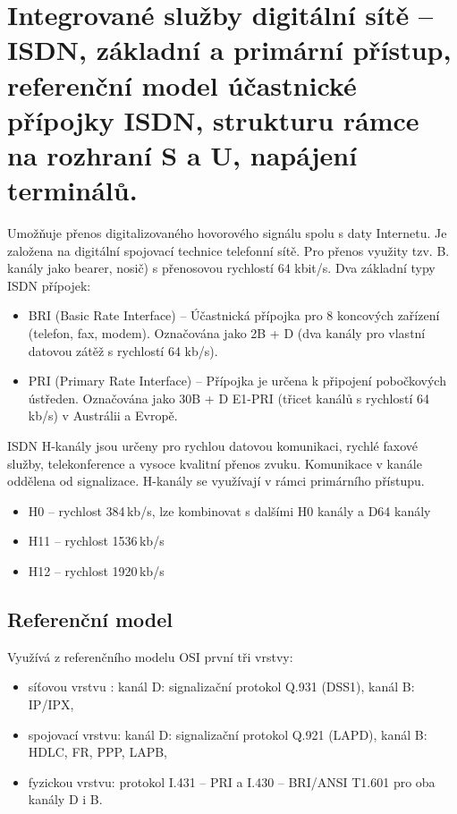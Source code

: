 \clearpage
\section{Integrované služby digitální sítě -- ISDN, základní a primární přístup, referenční model účastnické přípojky ISDN, strukturu rámce na rozhraní S a U, napájení terminálů.}
Umožňuje přenos digitalizovaného hovorového signálu spolu s daty Internetu. Je založena na digitální spojovací technice telefonní sítě.
Pro přenos využity tzv. B. kanály jako bearer, nosič) s přenosovou rychlostí 64 kbit/s.
Dva základní typy ISDN přípojek:
\begin{itemize}
    \item BRI (Basic Rate Interface) -- Účastnická přípojka pro 8 koncových zařízení (telefon, fax, modem). Označována jako 2B + D (dva kanály pro vlastní datovou zátěž s rychlostí 64 kb/s).
    \item PRI (Primary Rate Interface) -- Přípojka je určena k připojení pobočkových ústředen. Označována jako 30B + D E1-PRI (třicet kanálů s rychlostí 64 kb/s) v Austrálii a Evropě.
\end{itemize}

ISDN H-kanály jsou určeny pro rychlou datovou komunikaci, rychlé faxové služby, telekonference a vysoce kvalitní přenos zvuku. Komunikace v kanále oddělena od signalizace. H-kanály se využívají v rámci primárního přístupu.
\begin{itemize}
    \item H0 -- rychlost 384\,kb/s, lze kombinovat s dalšími H0 kanály a D64 kanály
    \item H11 -- rychlost 1536\,kb/s
    \item H12 -- rychlost 1920\,kb/s
\end{itemize}

\subsection{Referenční model}
Využívá z referenčního modelu OSI první tři vrstvy:
\begin{itemize}
    \item síťovou vrstvu : kanál D: signalizační protokol Q.931 (DSS1), kanál B: IP/IPX,
    \item spojovací vrstvu: kanál D: signalizační protokol Q.921 (LAPD), kanál B: HDLC, FR, PPP, LAPB,
    \item fyzickou vrstvu: protokol I.431 -- PRI a I.430 -- BRI/ANSI T1.601 pro oba kanály D i B.
\end{itemize}

